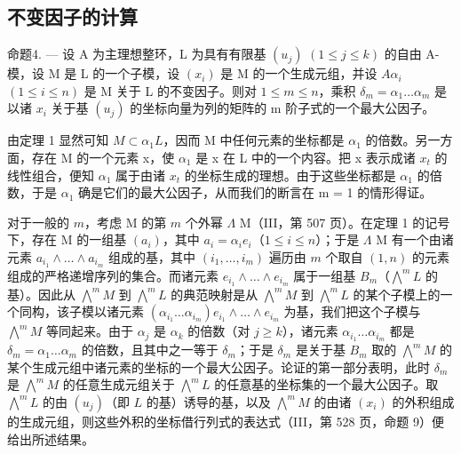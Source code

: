 \subsection{不变因子的计算}

命题4. --- 设 A 为主理想整环，L 为具有有限基 \((u_{j})\) \((1 \leqslant j \leqslant k)\) 的自由 A-模，设 M 是 L 的一个子模，设 \((x_{i})\) 是 M 的一个生成元组，并设 \(A\alpha_{i}\) \((1 \leqslant i \leqslant n)\) 是 M 关于 L 的不变因子。则对 \(1 \leqslant m \leqslant n\)，乘积 \(\delta_{m} = \alpha_{1} \ldots \alpha_{m}\) 是以诸 \(x_{i}\) 关于基 \((u_{j})\) 的坐标向量为列的矩阵的 m 阶子式的一个最大公因子。

由定理 1 显然可知 \(M \subset \alpha_{1}L\)，因而 M 中任何元素的坐标都是 \(\alpha_{1}\) 的倍数。另一方面，存在 M 的一个元素 x，使 \(\alpha_{1}\) 是 x 在 L 中的一个内容。把 x 表示成诸 \(x_{t}\) 的线性组合，便知 \(\alpha_{1}\) 属于由诸 \(x_{t}\) 的坐标生成的理想。由于这些坐标都是 \(\alpha_{1}\) 的倍数，于是 \(\alpha_{1}\) 确是它们的最大公因子，从而我们的断言在 m = 1 的情形得证。

对于一般的 \(m\)，考虑 M 的第 \(m\) 个外幂 \(\Lambda\) M（III，第 507 页）。在定理 1 的记号下，存在 M 的一组基 \((a_i)\)，其中 \(a_i = \alpha_i e_i\)（\(1 \leqslant i \leqslant n\)）；于是 \(\Lambda\) M 有一个由诸元素 \(a_{i_1} \wedge \ldots \wedge a_{i_m}\) 组成的基，其中 \((i_1, \ldots, i_m)\) 遍历由 \(m\) 个取自 \((1, n)\) 的元素组成的严格递增序列的集合。而诸元素 \(e_{i_1} \wedge \ldots \wedge e_{i_m}\) 属于一组基 \(B_m\)（\(\bigwedge^m L\) 的基）。因此从 \(\bigwedge^m M\) 到 \(\bigwedge^m L\) 的典范映射是从 \(\bigwedge^m M\) 到 \(\bigwedge^m L\) 的某个子模上的一个同构，该子模以诸元素 \((\alpha_{i_1} \ldots \alpha_{i_m}) e_{i_1} \wedge \ldots \wedge e_{i_m}\) 为基，我们把这个子模与 \(\bigwedge^m M\) 等同起来。由于 \(\alpha_j\) 是 \(\alpha_k\) 的倍数（对 \(j \geqslant k\)），诸元素 \(\alpha_{i_1} \ldots \alpha_{i_m}\) 都是 \(\delta_m = \alpha_1 \ldots \alpha_m\) 的倍数，且其中之一等于 \(\delta_m\)；于是 \(\delta_m\) 是关于基 \(B_m\) 取的 \(\bigwedge^m M\) 的某个生成元组中诸元素的坐标的一个最大公因子。论证的第一部分表明，此时 \(\delta_m\) 是 \(\bigwedge^m M\) 的任意生成元组关于 \(\bigwedge^m L\) 的任意基的坐标集的一个最大公因子。取 \(\bigwedge^m L\) 的由 \((u_j)\)（即 \(L\) 的基）诱导的基，以及 \(\bigwedge^m M\) 的由诸 \((x_i)\) 的外积组成的生成元组，则这些外积的坐标借行列式的表达式（III，第 528 页，命题 9）便给出所述结果。

